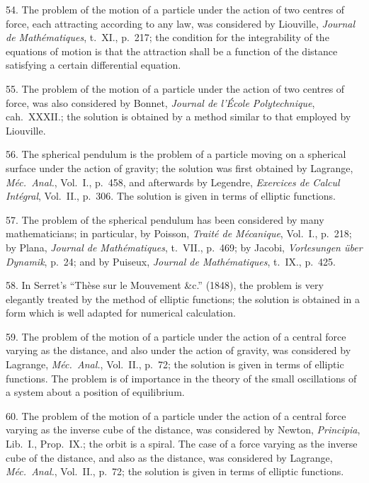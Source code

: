 \documentclass[11pt,a4paper]{article}
\begin{document}
\newpage
\setcounter{page}{520}

54. The problem of the motion of a particle under the action of two centres of force, each attracting according to any law, was considered by Liouville, \textit{Journal de Math\'ematiques}, t.~XI., p.~217; the condition for the integrability of the equations of motion is that the attraction shall be a function of the distance satisfying a certain differential equation.

55. The problem of the motion of a particle under the action of two centres of force, was also considered by Bonnet, \textit{Journal de l'\'Ecole Polytechnique}, cah.~XXXII.; the solution is obtained by a method similar to that employed by Liouville.

56. The spherical pendulum is the problem of a particle moving on a spherical surface under the action of gravity; the solution was first obtained by Lagrange, \textit{M\'ec.\ Anal.}, Vol.~I., p.~458, and afterwards by Legendre, \textit{Exercices de Calcul Int\'egral}, Vol.~II., p.~306. The solution is given in terms of elliptic functions.

57. The problem of the spherical pendulum has been considered by many mathematicians; in particular, by Poisson, \textit{Trait\'e de M\'ecanique}, Vol.~I., p.~218; by Plana, \textit{Journal de Math\'ematiques}, t.~VII., p.~469; by Jacobi, \textit{Vorlesungen \"uber Dynamik}, p.~24; and by Puiseux, \textit{Journal de Math\'ematiques}, t.~IX., p.~425.

58. In Serret's ``Th\`ese sur le Mouvement \&c.'' (1848), the problem is very elegantly treated by the method of elliptic functions; the solution is obtained in a form which is well adapted for numerical calculation.

\newpage
\setcounter{page}{525}

59. The problem of the motion of a particle under the action of a central force varying as the distance, and also under the action of gravity, was considered by Lagrange, \textit{M\'ec.\ Anal.}, Vol.~II., p.~72; the solution is given in terms of elliptic functions. The problem is of importance in the theory of the small oscillations of a system about a position of equilibrium.

60. The problem of the motion of a particle under the action of a central force varying as the inverse cube of the distance, was considered by Newton, \textit{Principia}, Lib.~I., Prop.~IX.; the orbit is a spiral. The case of a force varying as the inverse cube of the distance, and also as the distance, was considered by Lagrange, \textit{M\'ec.\ Anal.}, Vol.~II., p.~72; the solution is given in terms of elliptic functions.
\end{document}
